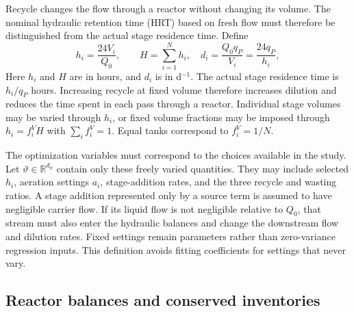 \documentclass[a4paper,fleqn]{cas-sc}
\newcommand{\R}{\mathbb{R}}
\begin{document}
Recycle changes the flow through a reactor without changing its volume. The nominal hydraulic retention time (HRT) based on fresh flow must therefore be distinguished from the actual stage residence time. Define
\begin{equation}
h_i=\frac{24V_i}{Q_0},\qquad H=\sum_{i=1}^{N}h_i,\quad
d_i=\frac{Q_0q_P}{V_i}=\frac{24q_P}{h_i},
\label{eq:stagehydraulics}
\end{equation}
Here $h_i$ and $H$ are in hours, and $d_i$ is in d$^{-1}$. The actual stage residence time is $h_i/q_P$ hours. Increasing recycle at fixed volume therefore increases dilution and reduces the time spent in each pass through a reactor. Individual stage volumes may be varied through $h_i$, or fixed volume fractions may be imposed through $h_i=f_i^V H$ with $\sum_i f_i^V=1$. Equal tanks correspond to $f_i^V=1/N$.

The optimization variables must correspond to the choices available in the study. Let $\vartheta\in\R^{d_\vartheta}$ contain only these freely varied quantities. They may include selected $h_i$, aeration settings $a_i$, stage-addition rates, and the three recycle and wasting ratios. A stage addition represented only by a source term is assumed to have negligible carrier flow. If its liquid flow is not negligible relative to $Q_0$, that stream must also enter the hydraulic balances and change the downstream flow and dilution rates. Fixed settings remain parameters rather than zero-variance regression inputs. This definition avoids fitting coefficients for settings that never vary.

\subsection{Reactor balances and conserved inventories}
\end{document}
